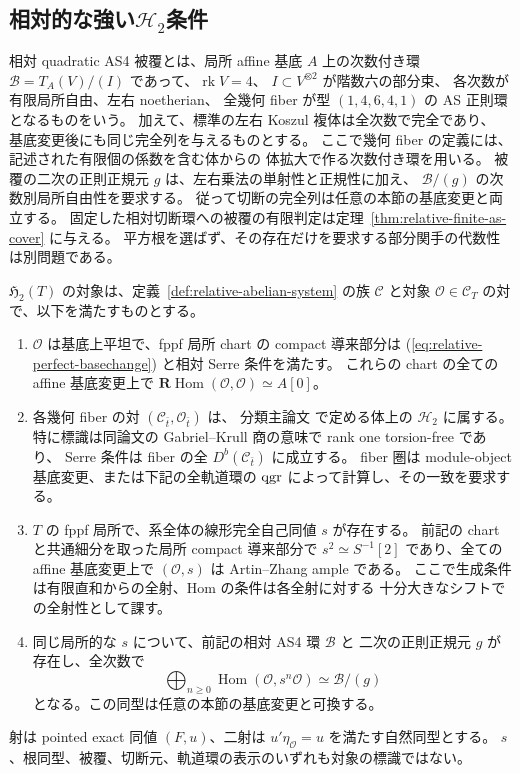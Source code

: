 \subsection{相対的な強い\texorpdfstring{$\mathcal H_2$}{H2}条件}

相対 quadratic AS4 被覆とは、局所 affine 基底 $A$ 上の次数付き環
$\mathcal B=T_A(V)/(I)$ であって、$\operatorname{rk}V=4$、
$I\subset V^{\otimes2}$ が階数六の部分束、
各次数が有限局所自由、左右 noetherian、
全幾何 fiber が型 $(1,4,6,4,1)$ の AS 正則環となるものをいう。
加えて、標準の左右 Koszul 複体は全次数で完全であり、
基底変更後にも同じ完全列を与えるものとする。
ここで幾何 fiber の定義には、記述された有限個の係数を含む体からの
体拡大で作る次数付き環を用いる。
被覆の二次の正則正規元 $g$ は、左右乗法の単射性と正規性に加え、
$\mathcal B/(g)$ の次数別局所自由性を要求する。
従って切断の完全列は任意の本節の基底変更と両立する。
固定した相対切断環への被覆の有限判定は定理~\ref{thm:relative-finite-as-cover} に与える。
平方根を選ばず、その存在だけを要求する部分関手の代数性は別問題である。

\begin{definition}
\label{def:relative-h2}
$\mathfrak H_2(T)$ の対象は、定義~\ref{def:relative-abelian-system} の族
$\mathcal C$ と対象 $\mathcal O\in\mathcal C_T$ の対で、以下を満たすものとする。
\begin{enumerate}[label=(RQ\arabic*)]
\item $\mathcal O$ は基底上平坦で、fppf 局所 chart の compact 導来部分は
  (\ref{eq:relative-perfect-basechange}) と相対 Serre 条件を満たす。
  これらの chart の全ての affine 基底変更上で
  $\mathbf R\operatorname{Hom}(\mathcal O,\mathcal O)\simeq A[0]$。
\item 各幾何 fiber の対 $(\mathcal C_{\bar t},\mathcal O_{\bar t})$ は、
  分類主論文 \cite{QuadricIntrinsic2026} で定める体上の $\mathcal H_2$ に属する。
  特に標識は同論文の Gabriel--Krull 商の意味で rank one torsion-free であり、
  Serre 条件は fiber の全 $D^b(\mathcal C_{\bar t})$ に成立する。
  fiber 圏は module-object 基底変更、または下記の全軌道環の
  $\operatorname{qgr}$ によって計算し、その一致を要求する。
\item $T$ の fppf 局所で、系全体の線形完全自己同値 $s$ が存在する。
  前記の chart と共通細分を取った局所 compact 導来部分で
  $s^2\simeq S^{-1}[2]$ であり、全ての affine 基底変更上で
  $(\mathcal O,s)$ は Artin--Zhang ample である。
  ここで生成条件は有限直和からの全射、Hom の条件は各全射に対する
  十分大きなシフトでの全射性として課す。
\item 同じ局所的な $s$ について、前記の相対 AS4 環 $\mathcal B$ と
  二次の正則正規元 $g$ が存在し、全次数で
  \[
   \bigoplus_{n\ge0}\operatorname{Hom}(\mathcal O,s^n\mathcal O)
     \simeq\mathcal B/(g)
  \]
  となる。この同型は任意の本節の基底変更と可換する。
\end{enumerate}
射は pointed exact 同値 $(F,u)$、二射は
$u'\eta_{\mathcal O}=u$ を満たす自然同型とする。
$s$、根同型、被覆、切断元、軌道環の表示のいずれも対象の標識ではない。
\end{definition}

